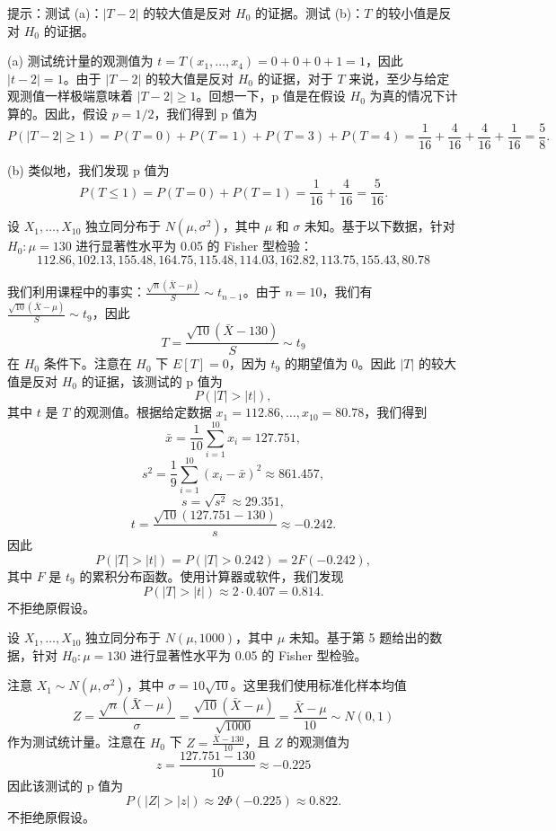 \begin{questions}
提示：测试 (a)：$|T - 2|$ 的较大值是反对 $H_0$ 的证据。测试 (b)：$T$ 的较小值是反对 $H_0$ 的证据。

\begin{solution}
(a) 测试统计量的观测值为 $t = T(x_1, \dots, x_4) = 0 + 0 + 0 + 1 = 1$，因此 $|t - 2| = 1$。由于 $|T - 2|$ 的较大值是反对 $H_0$ 的证据，对于 $T$ 来说，至少与给定观测值一样极端意味着 $|T - 2| \ge 1$。回想一下，p 值是在假设 $H_0$ 为真的情况下计算的。因此，假设 $p = 1/2$，我们得到 p 值为
\[
P(|T - 2| \ge 1) = P(T = 0) + P(T = 1) + P(T = 3) + P(T = 4) = \frac{1}{16} + \frac{4}{16} + \frac{4}{16} + \frac{1}{16} = \frac{5}{8}.
\]

(b) 类似地，我们发现 p 值为
\[
P(T \le 1) = P(T = 0) + P(T = 1) = \frac{1}{16} + \frac{4}{16} = \frac{5}{16}.
\]
\end{solution}

\question 设 $X_1, \dots, X_{10}$ 独立同分布于 $N(\mu, \sigma^2)$，其中 $\mu$ 和 $\sigma$ 未知。基于以下数据，针对 $H_0 : \mu = 130$ 进行显著性水平为 0.05 的 Fisher 型检验：
\[
112.86, 102.13, 155.48, 164.75, 115.48, 114.03, 162.82, 113.75, 155.43, 80.78
\]

\begin{solution}
我们利用课程中的事实：$\frac{\sqrt{n}(\bar{X} - \mu)}{S} \sim t_{n-1}$。由于 $n = 10$，我们有 $\frac{\sqrt{10}(\bar{X} - \mu)}{S} \sim t_9$，因此
\[
T = \frac{\sqrt{10}(\bar{X} - 130)}{S} \sim t_9
\]
在 $H_0$ 条件下。注意在 $H_0$ 下 $E[T] = 0$，因为 $t_9$ 的期望值为 0。因此 $|T|$ 的较大值是反对 $H_0$ 的证据，该测试的 p 值为
\[
P(|T| > |t|),
\]
其中 $t$ 是 $T$ 的观测值。根据给定数据 $x_1 = 112.86, \dots, x_{10} = 80.78$，我们得到
\[
\bar{x} = \frac{1}{10} \sum_{i=1}^{10} x_i = 127.751,
\]
\[
s^2 = \frac{1}{9} \sum_{i=1}^{10} (x_i - \bar{x})^2 \approx 861.457,
\]
\[
s = \sqrt{s^2} \approx 29.351,
\]
\[
t = \frac{\sqrt{10}(127.751 - 130)}{s} \approx -0.242.
\]
因此
\[
P(|T| > |t|) = P(|T| > 0.242) = 2F(-0.242),
\]
其中 $F$ 是 $t_9$ 的累积分布函数。使用计算器或软件，我们发现
\[
P(|T| > |t|) \approx 2 \cdot 0.407 = 0.814.
\]
不拒绝原假设。
\end{solution}

\question 设 $X_1, \dots, X_{10}$ 独立同分布于 $N(\mu, 1000)$，其中 $\mu$ 未知。基于第 5 题给出的数据，针对 $H_0 : \mu = 130$ 进行显著性水平为 0.05 的 Fisher 型检验。

\begin{solution}
注意 $X_1 \sim N(\mu, \sigma^2)$，其中 $\sigma = 10\sqrt{10}$。这里我们使用标准化样本均值
\[
Z = \frac{\sqrt{n}(\bar{X} - \mu)}{\sigma} = \frac{\sqrt{10}(\bar{X} - \mu)}{\sqrt{1000}} = \frac{\bar{X} - \mu}{10} \sim N(0, 1)
\]
作为测试统计量。注意在 $H_0$ 下 $Z = \frac{\bar{X} - 130}{10}$，且 $Z$ 的观测值为
\[
z = \frac{127.751 - 130}{10} \approx -0.225
\]
因此该测试的 p 值为
\[
P(|Z| > |z|) \approx 2\Phi(-0.225) \approx 0.822.
\]
不拒绝原假设。
\end{solution}


\end{questions}
